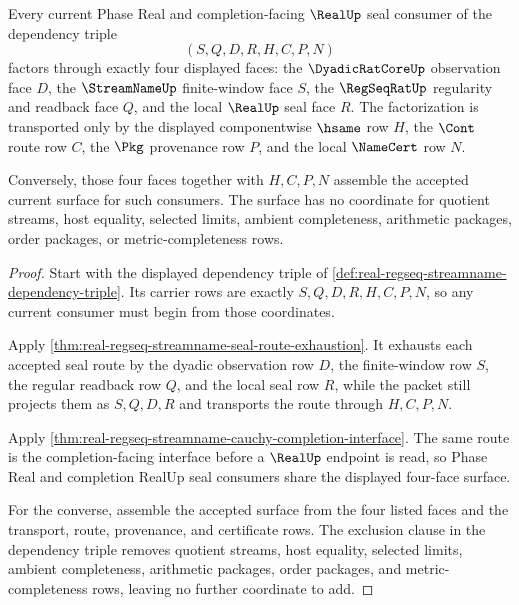 \begin{theorem}
\label{thm:real-open-phase-dependency-triple-current-surface}
Every current Phase Real and completion-facing $\RealUp$ seal consumer of the
dependency triple
$$
(S,Q,D,R,H,C,P,N)
$$
factors through exactly four displayed faces: the $\DyadicRatCoreUp$
observation face $D$, the $\StreamNameUp$ finite-window face $S$, the
$\RegSeqRatUp$ regularity and readback face $Q$, and the local $\RealUp$ seal
face $R$. The factorization is transported only by the displayed
componentwise $\hsame$ row $H$, the $\Cont$ route row $C$, the $\Pkg$
provenance row $P$, and the local $\NameCert$ row $N$.

Conversely, those four faces together with $H,C,P,N$ assemble the accepted
current surface for such consumers. The surface has no coordinate for quotient
streams, host equality, selected limits, ambient completeness, arithmetic
packages, order packages, or metric-completeness rows.
\end{theorem}
\begin{proof}
Start with the displayed dependency triple of
\autoref{def:real-regseq-streamname-dependency-triple}. Its carrier rows are
exactly $S,Q,D,R,H,C,P,N$, so any current consumer must begin from those
coordinates.

Apply \autoref{thm:real-regseq-streamname-seal-route-exhaustion}. It exhausts
each accepted seal route by the dyadic observation row $D$, the finite-window
row $S$, the regular readback row $Q$, and the local seal row $R$, while the
packet still projects them as $S,Q,D,R$ and transports the route through
$H,C,P,N$.

Apply \autoref{thm:real-regseq-streamname-cauchy-completion-interface}. The
same route is the completion-facing interface before a $\RealUp$ endpoint is
read, so Phase Real and completion RealUp seal consumers share the displayed
four-face surface.

For the converse, assemble the accepted surface from the four listed faces and
the transport, route, provenance, and certificate rows. The exclusion clause in
the dependency triple removes quotient streams, host equality, selected
limits, ambient completeness, arithmetic packages, order packages, and
metric-completeness rows, leaving no further coordinate to add.
\end{proof}

